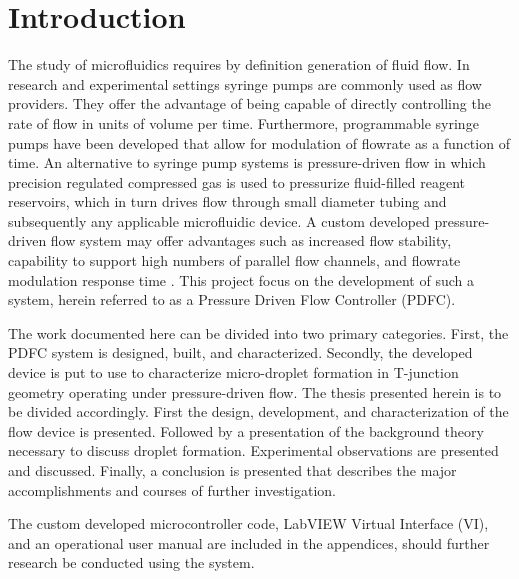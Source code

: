 \chapter{Introduction}

The study of microfluidics requires by definition generation of fluid flow. In research and experimental settings syringe pumps are commonly used as flow providers\cite{Christopher2008}. They offer the advantage of being capable of directly controlling the rate of flow in units of volume per time. Furthermore, programmable syringe pumps have been developed that allow for modulation of flowrate as a function of time. An alternative to syringe pump systems is pressure-driven flow in which precision regulated compressed gas is used to pressurize fluid-filled reagent reservoirs, which in turn drives flow through small diameter tubing and subsequently any applicable microfluidic device. A custom developed pressure-driven flow system may offer advantages such as increased flow stability, capability to support high numbers of parallel flow channels, and flowrate modulation response time \cite{Bong2011, Lim2015}. This project focus on the development of such a system, herein referred to as a Pressure Driven Flow Controller (PDFC). 

The work documented here can be divided into two primary categories. First, the PDFC system is designed, built, and characterized. Secondly, the developed device is put to use to characterize micro-droplet formation in T-junction geometry operating under pressure-driven flow. The thesis presented herein is to be divided accordingly. First the design, development, and characterization of the flow device is presented. Followed by a presentation of the background theory necessary to discuss droplet formation. Experimental observations are presented and discussed. Finally, a conclusion is presented that describes the major accomplishments and courses of further investigation.

The custom developed microcontroller code, LabVIEW Virtual Interface (VI), and an operational user manual are included in the appendices, should further research be conducted using the system.